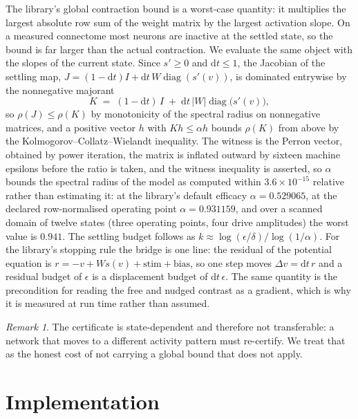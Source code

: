 \documentclass[11pt]{article}
\theoremstyle{remark}
\newtheorem{remark}[proposition]{Remark}
\newcommand{\abs}[1]{\lvert #1 \rvert}
\newcommand{\diag}{\operatorname{diag}}
\begin{document}
The library's global contraction bound is a worst-case quantity: it multiplies the largest absolute
row sum of the weight matrix by the largest activation slope. On a measured connectome most neurons
are inactive at the settled state, so the bound is far larger than the actual contraction. We
evaluate the same object with the slopes of the current state. Since $s' \ge 0$ and $\mathrm{d}t \le 1$,
the Jacobian of the settling map, $J = (1-\mathrm{d}t)I + \mathrm{d}t\,W\diag(s'(v))$, is dominated
entrywise by the nonnegative majorant
\begin{equation}
K \;=\; (1-\mathrm{d}t)\,I \;+\; \mathrm{d}t\, \abs{W} \diag\!\big(s'(v)\big),
\label{eq:localK}
\end{equation}
so $\rho(J) \le \rho(K)$ by monotonicity of the spectral radius on nonnegative matrices, and a positive
vector $h$ with $Kh \le \alpha h$ bounds $\rho(K)$ from above by the Kolmogorov--Collatz--Wielandt
inequality. The witness is the Perron vector, obtained by power iteration, the matrix is inflated
outward by sixteen machine epsilons before the ratio is taken, and the witness inequality is
asserted, so $\alpha$ bounds the spectral radius of the model as computed within $3.6\times10^{-15}$
relative rather than estimating it: at the library's default efficacy $\alpha = 0.529065$, at the
declared row-normalised operating point $\alpha = 0.931159$, and over a scanned domain of twelve
states (three operating points, four drive amplitudes) the worst value is $0.941$. The settling budget
follows as $k \approx \log(\epsilon/\delta)/\log(1/\alpha)$. For the library's stopping
rule the bridge is one line: the residual of the potential equation is
$r = -v + Ws(v) + \text{stim} + \text{bias}$, so one step moves $\Delta v = \mathrm{d}t\, r$ and a residual
budget of $\epsilon$ is a displacement budget of $\mathrm{d}t\,\epsilon$. The same quantity is the
precondition for reading the free and nudged contrast as a gradient, which is why it is measured at run
time rather than assumed.

\begin{remark}
The certificate is state-dependent and therefore not transferable: a network that moves to a
different activity pattern must re-certify. We treat that as the honest cost of not carrying a
global bound that does not apply.
\end{remark}

\section{Implementation}
\end{document}
